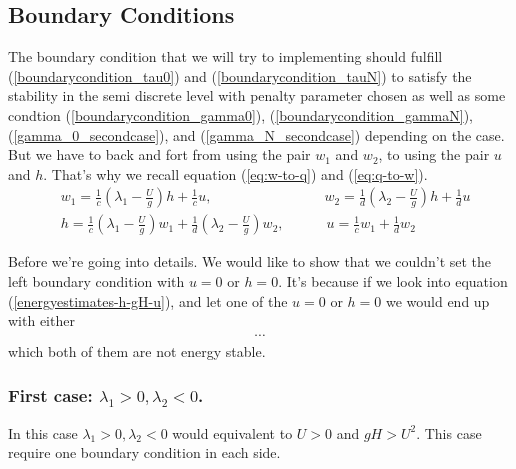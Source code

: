\documentclass{article}
\newcommand{\half}{\frac{1}{2}}
\theoremstyle{definition}
\begin{document}
\subsection{Boundary Conditions}
    The boundary condition that we will try to implementing should fulfill
    (\ref{boundarycondition_tau0}) and (\ref{boundarycondition_tauN}) to satisfy the stability 
    in the semi discrete level with penalty parameter chosen as well as some condtion 
    (\ref{boundarycondition_gamma0}), (\ref{boundarycondition_gammaN}), 
    (\ref{gamma_0_secondcase}), and (\ref{gamma_N_secondcase}) depending on the case. 
    But we have to back and fort 
    from using the pair $w_1$ and $w_2$, to using the pair $u$ and $h$. That's why we recall 
    equation (\ref{eq:w-to-q}) and (\ref{eq:q-to-w}).
    \begin{align}
        &w_1 = \frac{1}{c}\left(\lambda_1 -\frac{ U}{g}\right) h + \frac{1}{c} u, \qquad\qquad\qquad\qquad  w_2 = \frac{1}{d}\left(\lambda_2 -\frac{ U}{g}\right) h + \frac{1}{d} u \\
        &h = \frac{1}{c}\left(\lambda_1 -\frac{ U}{g}\right) w_1 +  \frac{1}{d}\left(\lambda_2 -\frac{ U}{g}\right) w_2, \quad\qquad  u = \frac{1}{c} w_1 + \frac{1}{d} w_2
    \end{align}


    Before we're going into details. We would like to show that we couldn't set 
    the left boundary condition with $u=0$ or $h=0$. It's because if we look into 
    equation (\ref{energyestimates-h-gH-u}), and let one of the $u=0$ or $h=0$ we would end up 
    with either 
    \begin{align}
        \cdots
    \end{align}
    which both of them are not energy stable. 


    \subsubsection{First case: $\lambda_1 >0, \lambda_2<0$.}
        In this case $\lambda_1 >0, \lambda_2<0$ would equivalent to 
        $U>0$ and $gH > U^2$. This case require one boundary condition in each side. 
\end{document}
